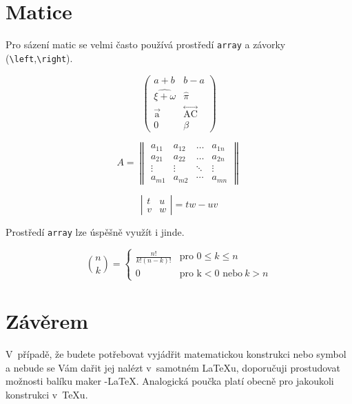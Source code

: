 \documentclass[a4paper, 11pt]{article}
\theoremstyle{definition}
\theoremstyle{definition}
\begin{document}
\section{Matice}

Pro sázení matic se velmi často používá prostředí \texttt{array} a závorky (\verb|\left|,\verb|\right|). 

$$
\left(
\begin{array}{cc}
a+b & b-a \\
\widehat{\xi + \omega} & \widehat{\pi} \\
\mathop{a}\limits^{\rightarrow} & \mathop{AC}\limits^{\longleftrightarrow} \\
0 & \beta
\end{array}
\right)
$$

$$
A = 
\left\| 
\begin{array}{cccc}
a_{11} & a_{12} & \ldots & a_{1n} \\
a_{21} & a_{22} & \ldots & a_{2n} \\
\vdots & \vdots & \ddots & \vdots \\
a_{m1} & a_{m2} & \cdots & a_{mn}
\end{array}
\right\|
$$

$$
\left|
\begin{array}{cc}
t & u \\ v & w
\end{array}
\right|
= tw - uv
$$

Prostředí \texttt{array} lze úspěšně využít i jinde.

$$
\binom{n}{k}
=
\left\{
	\begin{array}{ll}
	\frac{n!}{k!(n-k)!} & \mbox{pro 0} \leq k \leq n \\
	0 & \mbox{pro k} < \mbox{0 nebo}\ k > n
	\end{array}
\right.
$$

\section{Závěrem}

V~případě, že budete potřebovat vyjádřit mate\-matickou konstrukci nebo symbol a nebude se Vám dařit jej nalézt v~samotném \LaTeX u, doporučuji prostudovat možnosti balíku maker \AmS-\LaTeX.
Analogická poučka platí obec\-ně pro jakoukoli konstrukci v~\TeX u.
\end{document}
